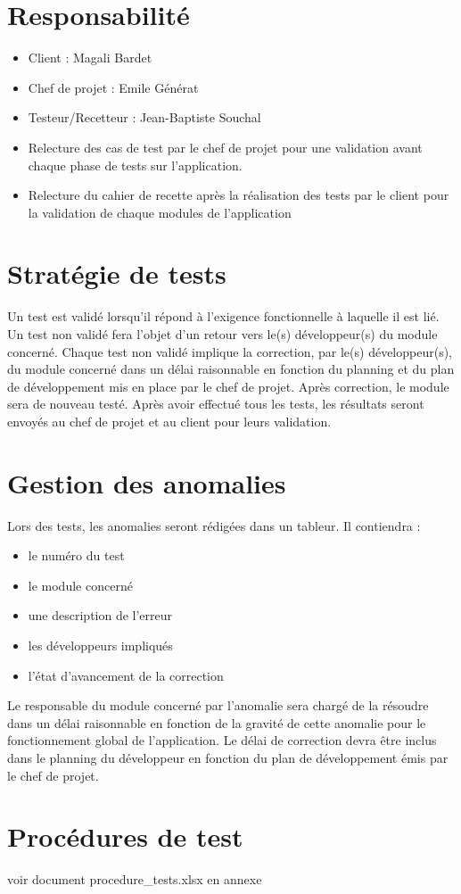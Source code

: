 \documentclass[a4paper,11pt,french]{article}
\begin{document}
\section{Responsabilité}

\begin{itemize}
  \item Client : Magali Bardet
  \item Chef de projet : Emile Générat
  \item Testeur/Recetteur : Jean-Baptiste Souchal
  \item Relecture des cas de test par le chef de projet pour une validation avant 
  chaque phase de tests sur l'application.
  \item Relecture du cahier de recette après la réalisation des tests par le 
  client pour la validation de chaque modules de l'application
\end{itemize}

\section{Stratégie de tests}
Un test est validé lorsqu’il répond à l’exigence fonctionnelle à laquelle il est lié.
Un test non validé fera l’objet d’un retour vers le(s) développeur(s) du module concerné.
Chaque test non validé implique la correction, par le(s) développeur(s), du module concerné dans
un délai raisonnable en fonction du planning et du plan de développement mis en place par le chef de
projet. Après correction, le module sera de nouveau testé. Après avoir effectué tous les tests, les
résultats seront envoyés au chef de projet et au client pour leurs validation.

\section{Gestion des anomalies}
Lors des tests, les anomalies seront rédigées dans un tableur. Il contiendra :

\begin{itemize}
  \item le numéro du test
  \item le module concerné
  \item une description de l'erreur
  \item les développeurs impliqués
  \item l’état d’avancement de la correction
\end{itemize}

Le responsable du module concerné par l’anomalie sera chargé de la résoudre dans un
  délai raisonnable en fonction de la gravité de cette anomalie pour le fonctionnement global
  de l’application. Le délai de correction devra être inclus dans le planning du développeur en fonction
  du plan de développement émis par le chef de projet.

\section{Procédures de test}
voir document procedure\_tests.xlsx en annexe
\end{document}
